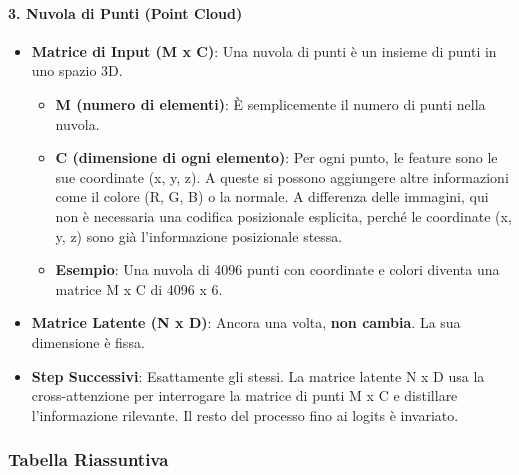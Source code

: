 \documentclass[
  11pt,
]{article}
\begin{document}
\paragraph{\texorpdfstring{\textbf{3. Nuvola di Punti (Point
Cloud)}}{3. Nuvola di Punti (Point Cloud)}}\label{nuvola-di-punti-point-cloud}

\begin{itemize}
\item
  \textbf{Matrice di Input (M x C)}: Una nuvola di punti è un insieme di
  punti in uno spazio 3D.

\begin{itemize}
  \item
    \textbf{M (numero di elementi)}: È semplicemente il numero di punti
    nella nuvola.
  \item
    \textbf{C (dimensione di ogni elemento)}: Per ogni punto, le feature
    sono le sue coordinate (x, y, z). A queste si possono aggiungere
    altre informazioni come il colore (R, G, B) o la normale. A
    differenza delle immagini, qui non è necessaria una codifica
    posizionale esplicita, perché le coordinate (x, y, z) sono già
    l'informazione posizionale stessa.
  \item
    \textbf{Esempio}: Una nuvola di 4096 punti con coordinate e colori
    diventa una matrice M x C di 4096 x 6.
  \end{itemize}
\item
  \textbf{Matrice Latente (N x D)}: Ancora una volta, \textbf{non
  cambia}. La sua dimensione è fissa.
\item
  \textbf{Step Successivi}: Esattamente gli stessi. La matrice latente N
  x D usa la cross-attenzione per interrogare la matrice di punti M x C
  e distillare l'informazione rilevante. Il resto del
  processo fino ai logits è invariato.
\end{itemize}

\subsubsection{\texorpdfstring{\textbf{Tabella
Riassuntiva}}{Tabella Riassuntiva}}\label{tabella-riassuntiva}
\end{document}
